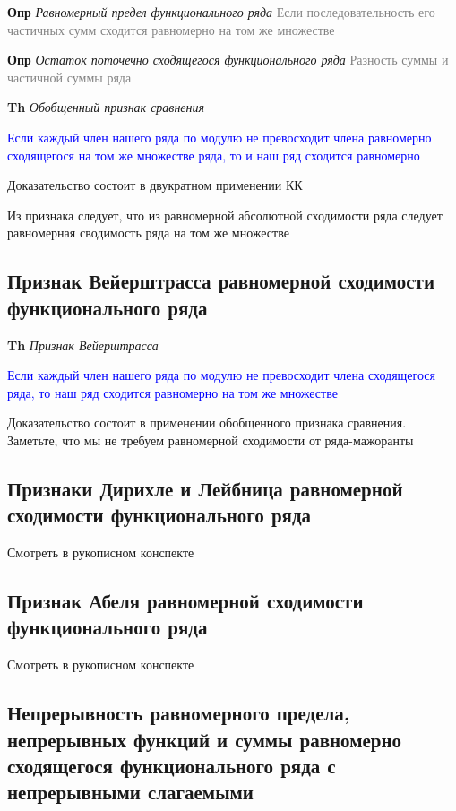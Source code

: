\textbf{Опр} \textit{Равномерный предел функционального ряда} \textcolor{gray}{Если последовательность его
частичных сумм сходится равномерно на том же множестве}

\textbf{Опр} \textit{Остаток поточечно сходящегося функционального ряда} \textcolor{gray}{Разность суммы и
частичной суммы ряда}

\textbf{Th} \textit{Обобщенный признак сравнения}

\textcolor{blue}{Если каждый член нашего ряда по модулю не превосходит члена равномерно сходящегося на том же
множестве ряда, то и наш ряд сходится равномерно}

Доказательство состоит в двукратном применении КК

Из признака следует, что из равномерной абсолютной сходимости ряда следует равномерная сводимость ряда на том же
множестве

\subsection{Признак Вейерштрасса равномерной сходимости функционального ряда}

\textbf{Th} \textit{Признак Вейерштрасса}

\textcolor{blue}{Если каждый член нашего ряда по модулю не превосходит члена сходящегося ряда, то наш ряд
сходится равномерно на том же множестве}

Доказательство состоит в применении обобщенного признака сравнения.
Заметьте, что мы не требуем равномерной сходимости от ряда-мажоранты

\subsection{Признаки Дирихле и Лейбница равномерной сходимости функционального ряда}

Смотреть в рукописном конспекте

\subsection{Признак Абеля равномерной сходимости функционального ряда}

Смотреть в рукописном конспекте

\subsection{Непрерывность равномерного предела, непрерывных функций и суммы равномерно сходящегося функционального ряда с
непрерывными слагаемыми}


